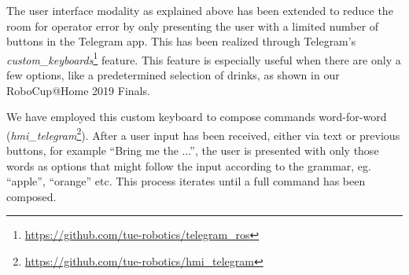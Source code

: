 \label{ssec:keyboard}
\noindent The user interface modality as explained above has been extended to reduce the room for operator error by only presenting the user with a limited number of buttons in the Telegram app. This has been realized through Telegram's \emph{custom\_keyboards}\footnote{\url{https://github.com/tue-robotics/telegram_ros}} feature. This feature is especially useful when there are only a few options, like a predetermined selection of drinks, as shown in our RoboCup@Home 2019 Finals.

We have employed this custom keyboard to compose commands word-for-word (\emph{hmi\_telegram}\footnote{\url{https://github.com/tue-robotics/hmi_telegram}}). After a  user input has been received, either via text or previous buttons, for example “Bring me the ...”, the user is presented with only those words as options that might follow the input according to the grammar, eg. “apple”, “orange” etc. This process iterates until a full command has been composed.